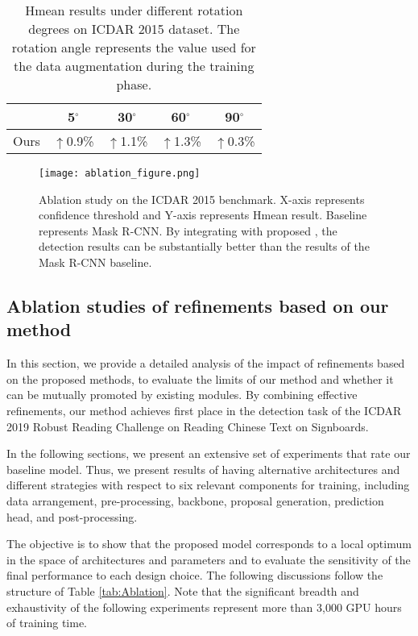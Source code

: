 \begin{table}[!t]
\caption{Hmean results under different rotation degrees on ICDAR 2015 dataset. The rotation angle represents the value used for the data augmentation during the training phase.}
\label{tab:ab1_rd}
\centering
\newcommand{\tabincell}[2]{\begin{tabular}{@{}#1@{}}#2\end{tabular}}
\small
\begin{tabular}{c|c|c|c|c}
  \hline
   & 5$^{\circ}$ & 30$^{\circ}$  & 60$^{\circ}$  & 90$^{\circ}$ \\
  \hline
  Ours & $\uparrow$0.9\% & $\uparrow$1.1\% & $\uparrow$1.3\% & $\uparrow$0.3\% \\
  \hline
\end{tabular}
\end{table}


\begin{figure}[htb]
  \centering
  \centerline{\texttt{[image: ablation\_figure.png]}}
  \caption{Ablation study on the ICDAR 2015 benchmark. X-axis represents confidence threshold and Y-axis represents Hmean result. Baseline represents Mask R-CNN. By integrating with proposed \Ours, the detection results can be substantially better than the results of the Mask R-CNN baseline.}\label{fig:ablation}
\end{figure}


\subsection{Ablation studies of refinements based on our method}
In this section, we provide a detailed analysis of the impact of refinements based on the proposed methods, to evaluate the limits of our method and whether it can be mutually promoted by existing modules. By combining
effective refinements, our method achieves first place in the detection task of the ICDAR 2019 Robust Reading Challenge on Reading Chinese Text on Signboards. 

In the following sections, we present an extensive set of experiments that rate our baseline model. Thus, we present results of \Ours having alternative architectures and different strategies with respect to six relevant components for training, including data arrangement, pre-processing, backbone, proposal generation, prediction head, and post-processing.


The objective is to show that the proposed model corresponds to a local optimum in the space of architectures and parameters and to evaluate the sensitivity of the final performance to each design choice. The following discussions follow the structure of Table \ref{tab:Ablation}. Note that the significant breadth and exhaustivity of the following experiments represent more than 3,000 GPU hours of training time.

